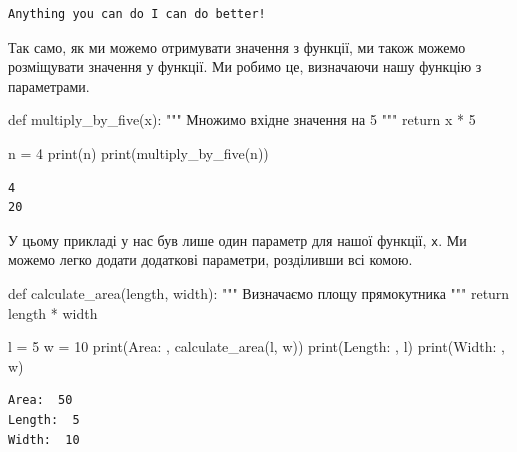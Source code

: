 \documentclass[
  letterpaper,
]{report}
\newenvironment{Shaded}{\begin{snugshade}}{\end{snugshade}}
\newcommand{\BuiltInTok}[1]{\textcolor[rgb]{0.00,0.23,0.31}{#1}}
\newcommand{\CommentTok}[1]{\textcolor[rgb]{0.37,0.37,0.37}{#1}}
\newcommand{\ControlFlowTok}[1]{\textcolor[rgb]{0.00,0.23,0.31}{#1}}
\newcommand{\DecValTok}[1]{\textcolor[rgb]{0.68,0.00,0.00}{#1}}
\newcommand{\KeywordTok}[1]{\textcolor[rgb]{0.00,0.23,0.31}{#1}}
\newcommand{\NormalTok}[1]{\textcolor[rgb]{0.00,0.23,0.31}{#1}}
\newcommand{\OperatorTok}[1]{\textcolor[rgb]{0.37,0.37,0.37}{#1}}
\newcommand{\StringTok}[1]{\textcolor[rgb]{0.13,0.47,0.30}{#1}}
\begin{document}
\begin{verbatim}
Anything you can do I can do better!
\end{verbatim}

Так само, як ми можемо отримувати значення з функції, ми також можемо
розміщувати значення у функції. Ми робимо це, визначаючи нашу функцію з
параметрами.

\begin{Shaded}
\begin{Highlighting}[]
\KeywordTok{def}\NormalTok{ multiply\_by\_five(x):}
    \CommentTok{""" Множимо вхідне значення на 5 """}
    \ControlFlowTok{return}\NormalTok{ x }\OperatorTok{*} \DecValTok{5}

\NormalTok{n }\OperatorTok{=} \DecValTok{4}
\BuiltInTok{print}\NormalTok{(n)}
\BuiltInTok{print}\NormalTok{(multiply\_by\_five(n))}
\end{Highlighting}
\end{Shaded}

\begin{verbatim}
4
20
\end{verbatim}

У цьому прикладі у нас був лише один параметр для нашої функції,
\texttt{x}. Ми можемо легко додати додаткові параметри, розділивши всі
комою.

\begin{Shaded}
\begin{Highlighting}[]
\KeywordTok{def}\NormalTok{ calculate\_area(length, width):}
    \CommentTok{""" Визначаємо площу прямокутника """}
    \ControlFlowTok{return}\NormalTok{ length }\OperatorTok{*}\NormalTok{ width}
\end{Highlighting}
\end{Shaded}

\begin{Shaded}
\begin{Highlighting}[]
\NormalTok{l }\OperatorTok{=} \DecValTok{5}
\NormalTok{w }\OperatorTok{=} \DecValTok{10}
\BuiltInTok{print}\NormalTok{(}\StringTok{\textquotesingle{}Area: \textquotesingle{}}\NormalTok{, calculate\_area(l, w))}
\BuiltInTok{print}\NormalTok{(}\StringTok{\textquotesingle{}Length: \textquotesingle{}}\NormalTok{, l)}
\BuiltInTok{print}\NormalTok{(}\StringTok{\textquotesingle{}Width: \textquotesingle{}}\NormalTok{, w)}
\end{Highlighting}
\end{Shaded}

\begin{verbatim}
Area:  50
Length:  5
Width:  10
\end{verbatim}
\end{document}

